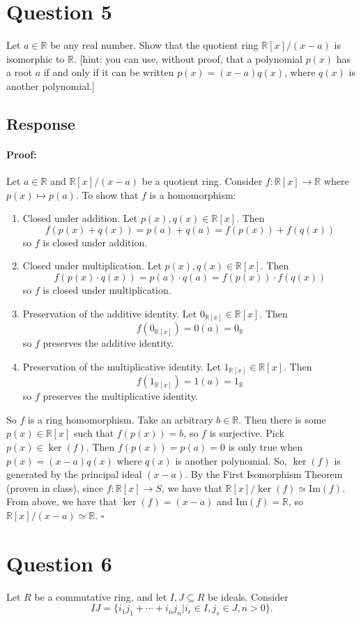 \documentclass [12pt] {article}
\newcommand{\R}{\mathbb{R}}
\newenvironment{proof}{\paragraph{Proof:}}{\hfill$\square$}
\renewcommand{\Im}{\text{Im}}
\begin{document}
\section*{Question 5}
Let $a\in\R$ be any real number. Show that the quotient ring $\R[x]/(x-a)$ is isomorphic to $\R$. [hint: you can use, without proof, that a polynomial $p(x)$ has a root $a$ if and only if it can be written $p(x)=(x-a)q(x)$, where $q(x)$ is another polynomial.] 
\subsection*{Response}
\begin{proof}
    Let $a \in \R$ and $\R[x]/(x - a)$ be a quotient ring. Consider $f : \R[x] \to \R$ where
    $p(x) \mapsto p(a)$. To show that $f$ is a homomorphism:
    \begin{enumerate}
        \item Closed under addition. Let $p(x), q(x) \in \R[x]$. Then
            \[f(p(x) + q(x)) = p(a) + q(a) = f(p(x)) + f(q(x))\]
            so $f$ is closed under addition.
        \item Closed under multiplication. Let $p(x), q(x) \in \R[x]$. Then
            \[f(p(x) \cdot q(x)) = p(a) \cdot q(a) = f(p(x)) \cdot f(q(x))\]
            so $f$ is closed under multiplication.
        \item Preservation of the additive identity. Let $0_{\R[x]} \in \R[x]$. Then
            \[f(0_{\R[x]}) = 0(a) = 0_{\R}\]
            so $f$ preserves the additive identity.
        \item Preservation of the multiplicative identity. Let $1_{\R[x]} \in \R[x]$. Then
            \[f(1_{\R[x]}) = 1(a) = 1_{\R}\]
            so $f$ preserves the multiplicative identity.
    \end{enumerate}
    So $f$ is a ring homomorphism. Take an arbitrary $b \in \R$. Then there is some $p(x) \in \R[x]$ 
    such that $f(p(x)) = b$, so $f$ is surjective. Pick $p(x) \in \ker(f)$. Then $f(p(x)) = p(a) = 0$ 
    is only true when $p(x) = (x - a)q(x)$ where $q(x)$ is another polynomial. So, $\ker(f)$ is 
    generated by the principal ideal $(x - a)$. By the First Isomorphism Theorem (proven in class),
    since $f : \R[x] \to S$, we have that $\R[x]/\ker(f) \simeq \Im(f)$. From above, we have that
    $\ker(f) = (x - a)$ and $\Im(f) = \R$, so $\R[x]/(x - a) \simeq \R$.
\end{proof}
\newpage

\section*{Question 6}
Let $R$ be a commutative ring, and let $I,J\subseteq R$ be ideals. Consider $$IJ=\{i_1j_1+\cdots + i_nj_n|i_r\in I, j_s\in J, n>0\}.$$
\end{document}
